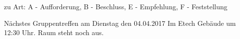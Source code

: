 \documentclass[
   draft=false
  ,paper=a4
  ,twoside=false
  ,fontsize=11pt
  ,headsepline
  ,DIV11
  ,parskip=full+
]{scrartcl} %
\begin{document}
\vspace{-2.5em}
\footnotesize
zu Art: A - Aufforderung, B - Beschluss, E - Empfehlung, F - Feststellung \\
\normalsize

Nächstes Gruppentreffen am Dienstag den 04.04.2017 Im Etech Gebäude 
um 12:30 Uhr. Raum steht noch aus.


\flushleft
\end{document}
